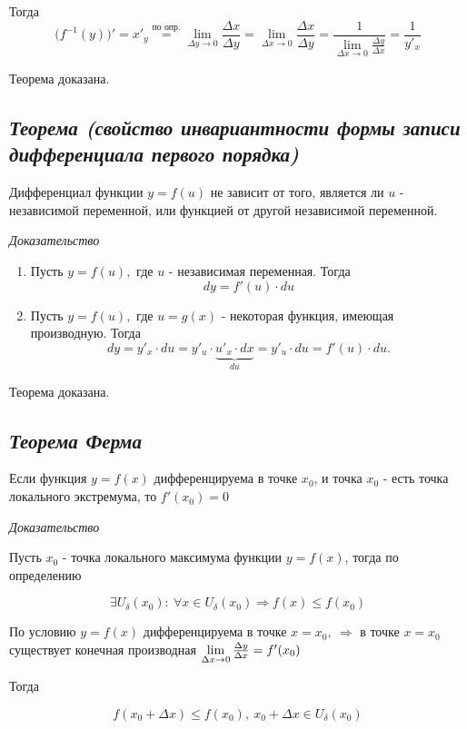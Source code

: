 Тогда $$\big(f^{-1}(y)\big)' = x'_y \overset{\text{по опр.}}{=} \lim\limits_{\Delta y \rightarrow 0} {\frac{\Delta x}{\Delta y}}=\lim\limits_{\Delta x \rightarrow 0} {\frac{\Delta x}{\Delta y}} = \frac{1}{\lim\limits_{\Delta x \rightarrow 0} {\frac{\Delta y}{\Delta x}}} = \frac{1}{y'_x}$$

Теорема доказана.
\newpage 
\subsection{\textit{Теорема (свойство инвариантности формы записи дифференциала первого порядка)}}

Дифференциал функции $y = f(u)$ не зависит от того, является ли $u$ - независимой переменной, или функцией от другой независимой переменной.

\textit{Доказательство}
\begin{enumerate}

\item Пусть $y = f(u),$ где $u$ - независимая переменная. Тогда $$dy = f'(u)\cdot du$$
\item Пусть $y = f(u),$ где $u = g(x)$ - некоторая функция, имеющая производную. Тогда $$dy = y'_x\cdot du = y'_u\cdot \underbrace{u'_x \cdot dx}_{du} = y'_u\cdot du = f'(u) \cdot du.$$

\end{enumerate}

Теорема доказана.
\newpage 
\subsection{\textit{Теорема Ферма}}

Если функция $y = f(x)$ дифференцируема в точке $x_0$, и точка $x_0$ - есть точка локального экстремума, то $f'(x_0) = 0$

\textit{Доказательство}

Пусть $x_0$ - точка локального максимума функции $y = f(x)$, тогда по определению

$$\exists U_\delta(x_0) : \ \forall x \in U_\delta(x_0) \Rightarrow f(x) \leqslant f(x_0)$$

По условию $y = f(x)$ дифференцируема в точке $x = x_0, \ \Rightarrow$ в точке $x = x_0$ существует конечная производная $\lim\limits_{\Delta x \rightarrow 0}{\Large\frac{\Delta y}{\Delta x}} = f'(x_0)$

Тогда

$$
f(x_0 + \Delta x) \leqslant f(x_0), \ x_0 + \Delta x \in U_\delta(x_0)
$$


